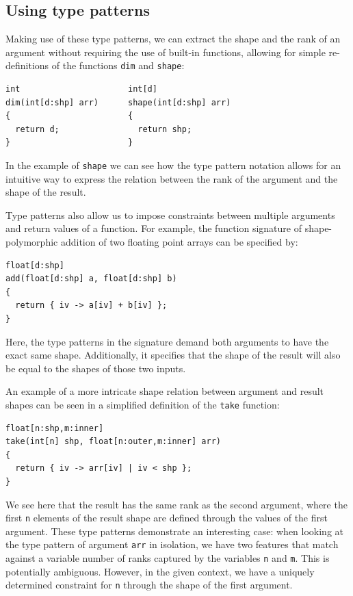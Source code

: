 \documentclass[sigconf,screen]{acmart}
\begin{document}
\subsection{Using type patterns}\label{sec:examples}
Making use of these type patterns, we can extract the shape and the rank of an argument without requiring the use of built-in functions, allowing for simple re-definitions of the functions \texttt{dim} and \texttt{shape}:

\begin{lstlisting}
int                      int[d]
dim(int[d:shp] arr)      shape(int[d:shp] arr)
{                        {
  return d;                return shp;
}                        }
\end{lstlisting}

In the example of \texttt{shape} we can see how the type pattern notation allows for an intuitive way to express the relation between the rank of the argument and the shape of the result.

Type patterns also allow us to impose constraints between multiple arguments and return values of a function.
For example, the function signature of shape-polymorphic addition of two floating point arrays can be specified by:

\begin{lstlisting}
float[d:shp]
add(float[d:shp] a, float[d:shp] b)
{
  return { iv -> a[iv] + b[iv] };
}
\end{lstlisting}

Here, the type patterns in the signature demand both arguments to have the exact same shape.
Additionally, it specifies that the shape of the result will also be equal to the shapes of those two inputs.

An example of a more intricate shape relation between argument and result shapes can be seen in a simplified definition of the \texttt{take} function:

\begin{lstlisting}
float[n:shp,m:inner]
take(int[n] shp, float[n:outer,m:inner] arr)
{
  return { iv -> arr[iv] | iv < shp };
}
\end{lstlisting}

We see here that the result has the same rank as the second argument, where the first \texttt{n} elements of the result shape are defined through the values of the first argument.
These type patterns demonstrate an interesting case: when looking at the type pattern of argument \texttt{arr} in isolation, we have two features that match against a variable number of ranks captured by the variables \texttt{n} and \texttt{m}.
This is potentially ambiguous.
However, in the given context, we have a uniquely determined constraint for \texttt{n} through the shape of the first argument.
\end{document}
